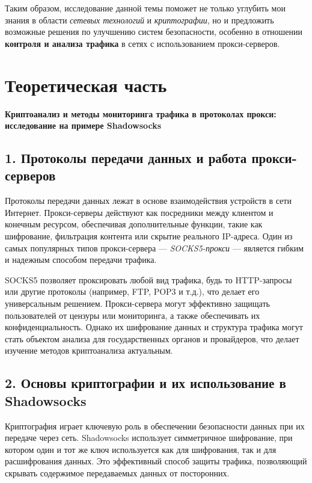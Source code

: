 \documentclass[a4paper,12pt]{article}
\begin{document}
Таким образом, исследование данной темы поможет не только углубить мои знания в области \textit{сетевых технологий} и \textit{криптографии}, но и предложить возможные решения по улучшению систем безопасности, особенно в отношении \textbf{контроля и анализа трафика} в сетях с использованием прокси-серверов.


\newpage

\section*{Теоретическая часть}
\textbf{Криптоанализ и методы мониторинга трафика в протоколах прокси: исследование на примере Shadowsocks}

\subsection*{1. Протоколы передачи данных и работа прокси-серверов}

Протоколы передачи данных лежат в основе взаимодействия устройств в сети Интернет. Прокси-серверы действуют как посредники между клиентом и конечным ресурсом, обеспечивая дополнительные функции, такие как шифрование, фильтрация контента или скрытие реального IP-адреса. Один из самых популярных типов прокси-сервера --- \textit{SOCKS5-прокси} --- является гибким и надежным способом передачи трафика.

SOCKS5 позволяет проксировать любой вид трафика, будь то HTTP-запросы или другие протоколы (например, FTP, POP3 и т.д.), что делает его универсальным решением. Прокси-сервера могут эффективно защищать пользователей от цензуры или мониторинга, а также обеспечивать их конфиденциальность. Однако их шифрование данных и структура трафика могут стать объектом анализа для государственных органов и провайдеров, что делает изучение методов криптоанализа актуальным.

\subsection*{2. Основы криптографии и их использование в Shadowsocks}

Криптография играет ключевую роль в обеспечении безопасности данных при их передаче через сеть. Shadowsocks использует симметричное шифрование, при котором один и тот же ключ используется как для шифрования, так и для расшифрования данных. Это эффективный способ защиты трафика, позволяющий скрывать содержимое передаваемых данных от посторонних.
\end{document}
